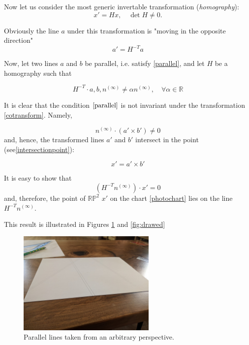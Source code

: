 \documentclass[a4paper,10pt]{article}
\begin{document}
Now let us consider the most generic invertable transformation ({\it homography}):
\begin{equation}
x' = H x, \quad \det H \neq 0. 
\end{equation}

Obviously the line $a$ under this transformation  is "moving in the opposite direction"
\begin{equation}
a'=H^{-T}a\label{cotransform}
\end{equation}

Now, let two lines $a$ and $b$ be parallel, i.e. satisfy \eqref{parallel},  and let $H$ be a homography such that

\begin{equation}
H^{-T} \cdot a,b,n^{(\infty)}  \neq \alpha n^{(\infty)} , \quad \forall \alpha \in \mathbb{R}
\end{equation}

 It is clear that the condition $\eqref{parallel}$ is not invariant under the transformation \eqref{cotransform}. Namely,

\begin{equation}
n^{(\infty)} \cdot (a'\times b')   \neq 0
\end{equation} 
 and, hence, the transformed lines $a'$ and $b'$ intersect in the point (see\eqref{intersectionpoint}):

\begin{equation}
x' = a' \times b'
\end{equation}

It is easy to show that 
\begin{equation}
(H^{-T}n^{(\infty)}) \cdot x'  = 0
\end{equation}
and, therefore, the point of $\mathbb{RP}^2$ $x'$ on the chart \eqref{photochart} lies on the line $H^{-T}n^{(\infty)}$. 

This result is illustrated in Figures \ref{fig:3dcart} and \ref{fig:drawed}

\begin{figure}[h]
\centering
 \includegraphics[width=0.6\textwidth]{../../images/parallel.jpg}
 \caption{Parallel lines taken from an arbitrary perspective. }
 \label{fig:3dcart}
\end{figure}
\end{document}
